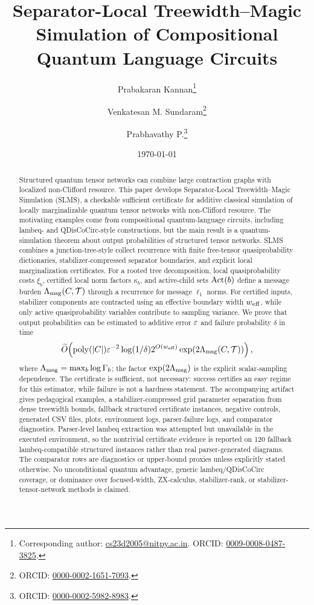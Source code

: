 \documentclass[a4paper,onecolumn,allowtoday]{quantumarticle}
\title{Separator-Local Treewidth--Magic Simulation of Compositional Quantum Language Circuits}
\author[1]{Prabakaran Kannan\thanks{Corresponding author: \href{mailto:cs23d2005@nitpy.ac.in}{cs23d2005@nitpy.ac.in}. ORCID: \href{https://orcid.org/0009-0008-0487-3825}{0009-0008-0487-3825}.}}
\author[1]{Venkatesan M. Sundaram\thanks{ORCID: \href{https://orcid.org/0000-0002-1651-7093}{0000-0002-1651-7093}.}}
\author[2]{Prabhavathy P.\thanks{ORCID: \href{https://orcid.org/0000-0002-5982-8983}{0000-0002-5982-8983}.}}
\affil[1]{Department of Computer Science and Engineering, National Institute of Technology Puducherry, Karaikal 609609, India}
\affil[2]{School of Computer Science and Engineering, Vellore Institute of Technology, Vellore 632014, India}
\date{\today}
\begin{document}
\maketitle

\begin{abstract}
Structured quantum tensor networks can combine large contraction graphs with localized non-Clifford resource. This paper develops Separator-Local Treewidth--Magic Simulation (SLMS), a checkable sufficient certificate for additive classical simulation of locally marginalizable quantum tensor networks with non-Clifford resource. The motivating examples come from compositional quantum-language circuits, including lambeq- and QDisCoCirc-style constructions, but the main result is a quantum-simulation theorem about output probabilities of structured tensor networks. SLMS combines a junction-tree-style collect recurrence with finite free-tensor quasiprobability dictionaries, stabilizer-compressed separator boundaries, and explicit local marginalization certificates. For a rooted tree decomposition, local quasiprobability costs \(\xi_b\), certified local norm factors \(\kappa_b\), and active-child sets \(\operatorname{Act}(b)\) define a message burden \(\Lambda_{\mathrm{msg}}(C,\mathcal{T})\) through a recurrence for message \(\ell_1\) norms. For certified inputs, stabilizer components are contracted using an effective boundary width \(w_{\mathrm{eff}}\), while only active quasiprobability variables contribute to sampling variance. We prove that output probabilities can be estimated to additive error \(\varepsilon\) and failure probability \(\delta\) in time
\[
\widetilde{O}\!\left(\operatorname{poly}(|C|)\varepsilon^{-2}\log(1/\delta)2^{O(w_{\mathrm{eff}})}
\exp(2\Lambda_{\mathrm{msg}}(C,\mathcal{T}))\right),
\]
where \(\Lambda_{\mathrm{msg}}=\max_b\log\Gamma_b\); the factor \(\exp(2\Lambda_{\mathrm{msg}})\) is the explicit scalar-sampling dependence. The certificate is sufficient, not necessary: success certifies an easy regime for this estimator, while failure is not a hardness statement. The accompanying artifact gives pedagogical examples, a stabilizer-compressed grid parameter separation from dense treewidth bounds, fallback structured certificate instances, negative controls, generated CSV files, plots, environment logs, parser-failure logs, and comparator diagnostics. Parser-level lambeq extraction was attempted but unavailable in the executed environment, so the nontrivial certificate evidence is reported on 120 fallback lambeq-compatible structured instances rather than real parser-generated diagrams. The comparator rows are diagnostics or upper-bound proxies unless explicitly stated otherwise. No unconditional quantum advantage, generic lambeq/QDisCoCirc coverage, or dominance over focused-width, ZX-calculus, stabilizer-rank, or stabilizer-tensor-network methods is claimed.
\end{abstract}
\end{document}
